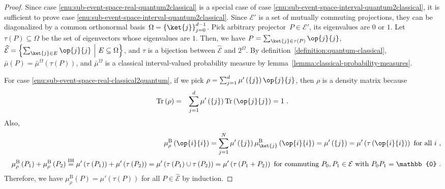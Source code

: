 \documentclass[12pt]{iopart}
\theoremstyle{plain}
\theoremstyle{definition}
\theoremstyle{remark}
\newcommand{\events}{\ensuremath{\mathcal{E}}}
\newcommand{\proj}[1]{\op{#1}{#1}}
\newcommand{\set}[2]{\ensuremath{\left\{ {#1}~\middle|~{#2}\right\} }}
\begin{document}
\begin{proof}Since case \ref{enu:sub-event-space-real-quantum2classical}
is a special case of case \ref{enu:sub-event-space-interval-quantum2classical},
it is sufficient to prove case \ref{enu:sub-event-space-interval-quantum2classical}.
Since $\events'$ is a set of mutually commuting projections, they
can be diagonalized by a common orthonormal basis~$\Omega=\left\{ \ket{j}\right\} _{j=0}^{d-1}$.
Pick arbitrary projector~$P\in\events'$, its eigenvalues are $0$
or $1$. Let $\tau\left(P\right)\subseteq\Omega$ be the set of eigenvectors
whose eigenvalues are $1$. Then, we have $P=\sum_{\ket{j}\in\tau\left(P\right)}\proj{j}$,
$\widehat{\events}=\set{\sum_{\ket{j}\in E}\proj{j}}{E\subseteq\Omega}$,
and $\tau$ is a bijection between $\widehat{\events}$ and $2^{\Omega}$.
By definition~\ref{definition:quantum-classical}, $\bar{\mu}\left(P\right)=\bar{\mu}^{\Omega}\left(\tau\left(P\right)\right)$,
and $\bar{\mu}^{\Omega}$ is a classical interval-valued probability
measure by lemma~\ref{lemma:classical-probability-measures}.

For case \ref{enu:sub-event-space-real-classical2quantum}, if we
pick $\rho=\sum_{j=1}^{d}\mu'\left(\left\{ j\right\} \right)\proj{j}$,
then $\rho$ is a density matrix because~\cite{544199}
\begin{eqnarray}
\Tr\left(\rho\right) & = & \sum_{j=1}^{d}\mu'\left(\left\{ j\right\} \right)\Tr\left(\proj{j}\right)=1\textrm{ .}
\end{eqnarray}
Also, 
\begin{eqnarray*}
 &  & \mu_{\rho}^{\mathrm{B}}\left(\proj{i}\right)=\sum_{j=1}^{N}\mu'\left(\left\{ j\right\} \right)\mu_{\ket{j}}^{\mathrm{\mathrm{B}}}\left(\proj{i}\right)=\mu'\left(\left\{ j\right\} \right)=\mu'\left(\tau\left(\proj{i}\right)\right)\textrm{ for all }i\textrm{ ,}\\
 &  & \mu_{\rho}^{\mathrm{B}}\left(P_{1}\right)+\mu_{\rho}^{\mathrm{B}}\left(P_{2}\right)\overset{\textrm{IH}}{=}\mu'\left(\tau\left(P_{1}\right)\right)+\mu'\left(\tau\left(P_{2}\right)\right)=\mu'\left(\tau\left(P_{1}\right)\cup\tau\left(P_{2}\right)\right)=\mu'\left(\tau\left(P_{1}+P_{2}\right)\right)\textrm{ for commuting }P_{0},P_{1}\in\events\textrm{ with }P_{0}P_{1}=\mathbb{0}\textrm{ .}
\end{eqnarray*}
Therefore, we have $\mu_{\rho}^{\mathrm{B}}\left(P\right)=\mu'\left(\tau\left(P\right)\right)$
for all $P\in\widehat{\events}$ by induction.\end{proof}
\end{document}
